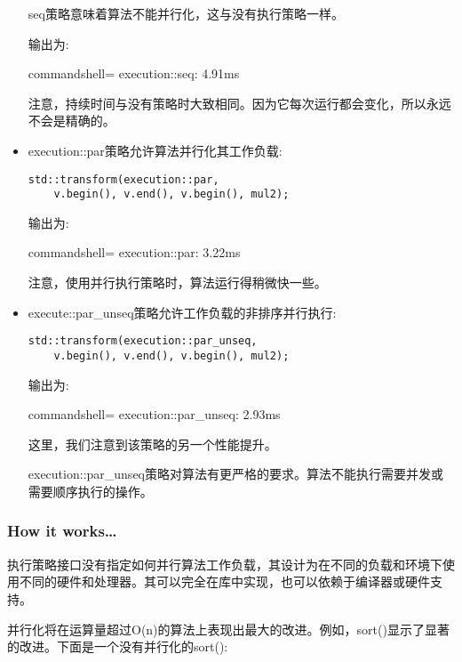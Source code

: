\begin{itemize}
seq策略意味着算法不能并行化，这与没有执行策略一样。

输出为:

\begin{tcblisting}{commandshell={}}
execution::seq: 4.91ms
\end{tcblisting}

注意，持续时间与没有策略时大致相同。因为它每次运行都会变化，所以永远不会是精确的。

\item 
execution::par策略允许算法并行化其工作负载:

\begin{lstlisting}[style=styleCXX]
std::transform(execution::par,
	v.begin(), v.end(), v.begin(), mul2);
\end{lstlisting}

输出为:

\begin{tcblisting}{commandshell={}}
execution::par: 3.22ms
\end{tcblisting}

注意，使用并行执行策略时，算法运行得稍微快一些。

\item 
execute::par\_unseq策略允许工作负载的非排序并行执行:

\begin{lstlisting}[style=styleCXX]
std::transform(execution::par_unseq,
	v.begin(), v.end(), v.begin(), mul2);
\end{lstlisting}

输出为:

\begin{tcblisting}{commandshell={}}
execution::par_unseq: 2.93ms
\end{tcblisting}

这里，我们注意到该策略的另一个性能提升。

execution::par\_unseq策略对算法有更严格的要求。算法不能执行需要并发或需要顺序执行的操作。
\end{itemize}

\subsubsection{How it works…}

执行策略接口没有指定如何并行算法工作负载，其设计为在不同的负载和环境下使用不同的硬件和处理器。其可以完全在库中实现，也可以依赖于编译器或硬件支持。

并行化将在运算量超过O(n)的算法上表现出最大的改进。例如，sort()显示了显著的改进。下面是一个没有并行化的sort():

